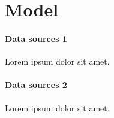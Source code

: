 \documentclass[paper.tex]{subfiles}
\begin{document}
\section{Model}\label{s:model}

\paragraph{Data sources 1} Lorem ipsum dolor sit amet.

\paragraph{Data sources 2} Lorem ipsum dolor sit amet.
\end{document}
